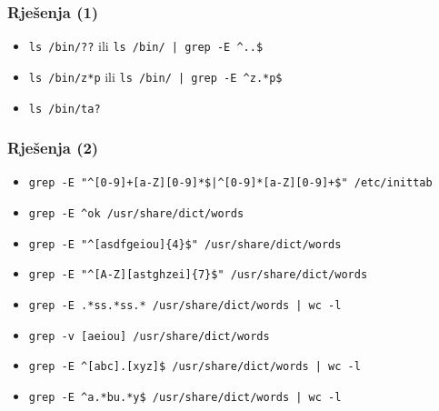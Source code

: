 \documentclass[table,usenames,dvipsnames]{beamer}
\newcommand{\shell}[1]{\texttt{#1}}
\begin{document}
\begin{frame}[t]
\frametitle{Rješenja (1)}
\begin{itemize}
	\item \shell{ls /bin/??} ili \shell{ls /bin/ | grep -E \textasciicircum{}..\$}
	\item \shell{ls /bin/z*p} ili \shell{ls /bin/ | grep -E \textasciicircum{}z.*p\$}
	\item \shell{ls /bin/ta?}
\end{itemize}
\end{frame}

\begin{frame}[t]
\frametitle{Rješenja (2)}
\begin{itemize}
  \item \shell{grep -E "\textasciicircum{}[0-9]+[a-Z][0-9]*\$|\textasciicircum{}[0-9]*[a-Z][0-9]+\$" /etc/inittab}
  \item \shell{grep -E \textasciicircum{}ok /usr/share/dict/words}
  \item \shell{grep -E "\textasciicircum{}[asdfgeiou]\{4\}\$" /usr/share/dict/words}
  \item \shell{grep -E "\textasciicircum{}[A-Z][astghzei]\{7\}\$" /usr/share/dict/words}
  \item \shell{grep -E .*ss.*ss.* /usr/share/dict/words | wc -l}
  \item \shell{grep -v [aeiou] /usr/share/dict/words}
  \item \shell{grep -E \textasciicircum{}[abc].[xyz]\$ /usr/share/dict/words | wc -l}
  \item \shell{grep -E \textasciicircum{}a.*bu.*y\$ /usr/share/dict/words | wc -l}
\end{itemize}
\end{frame}
\end{document}
